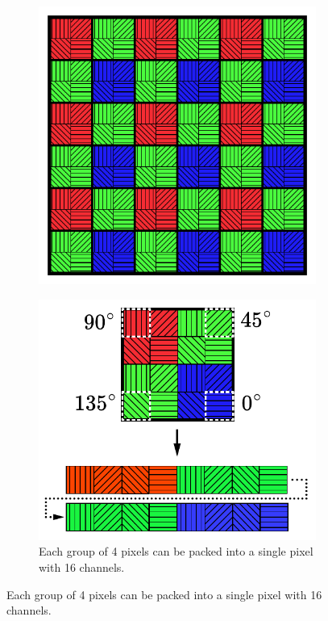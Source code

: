\begin{figure}[H]
    \begin{subfigure}{.5\textwidth}
        \centering
        \includegraphics[width=\textwidth]{figures/sensor_layout.pdf}
    \end{subfigure}
    \hspace{2em}
    \begin{subfigure}{.5\textwidth}
        \centering
        \includegraphics[width=\textwidth]{figures/sensor_packaging.pdf}
        \caption{Each group of 4 pixels can be packed into a single pixel with 16 channels.}


\end{subfigure}
\end{figure}
